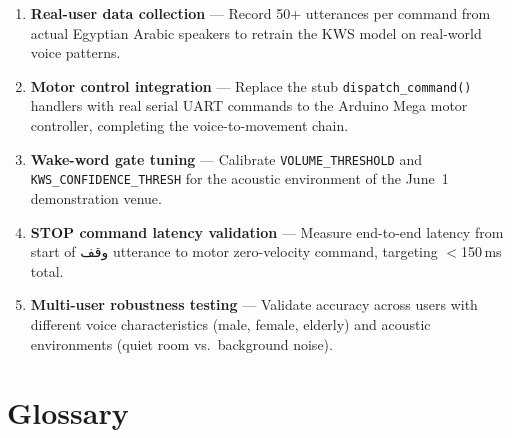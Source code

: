 \documentclass[12pt, a4paper]{report}
\begin{document}
\begin{enumerate}
  \item \textbf{Real-user data collection} --- Record 50+ utterances per command from
        actual Egyptian Arabic speakers to retrain the KWS model on real-world voice patterns.

  \item \textbf{Motor control integration} --- Replace the stub \texttt{dispatch\_command()}
        handlers with real serial UART commands to the Arduino Mega motor controller,
        completing the voice-to-movement chain.

  \item \textbf{Wake-word gate tuning} --- Calibrate \texttt{VOLUME\_THRESHOLD} and
        \texttt{KWS\_CONFIDENCE\_THRESH} for the acoustic environment of the
        June~1 demonstration venue.

  \item \textbf{STOP command latency validation} --- Measure end-to-end latency from
        start of \textarabic{وقف} utterance to motor zero-velocity command,
        targeting $<$150\,ms total.

  \item \textbf{Multi-user robustness testing} --- Validate accuracy across users with
        different voice characteristics (male, female, elderly) and acoustic environments
        (quiet room vs.\ background noise).
\end{enumerate}

\chapter{Glossary}
\end{document}
